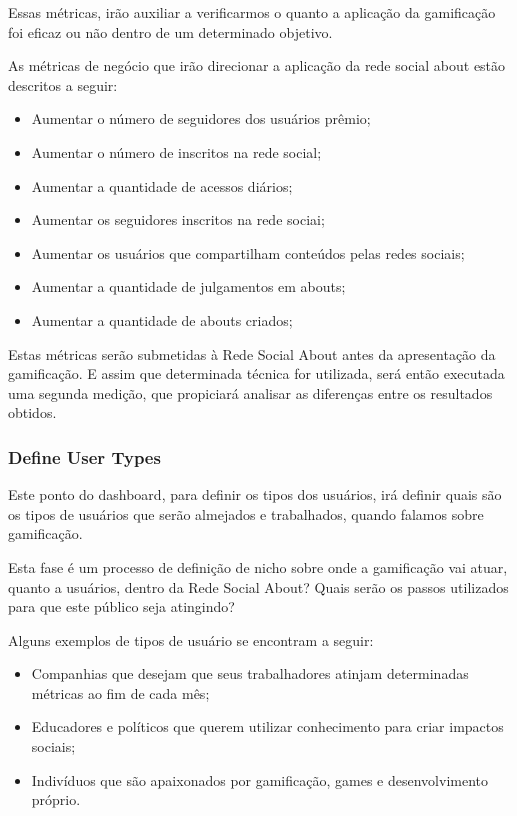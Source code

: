 Essas métricas, irão auxiliar a verificarmos o quanto a aplicação da gamificação foi 
eficaz ou não dentro de um determinado objetivo.

As métricas de negócio que irão direcionar a aplicação da rede social about estão
descritos a seguir:

\begin{itemize}
    \item Aumentar o número de seguidores dos usuários prêmio;
    \item Aumentar o número de inscritos na rede social;
    \item Aumentar a quantidade de acessos diários;
    \item Aumentar os seguidores inscritos na rede sociai;
    \item Aumentar os usuários que compartilham conteúdos pelas redes sociais;
    \item Aumentar a quantidade de julgamentos em abouts;
    \item Aumentar a quantidade de abouts criados;
\end{itemize}

Estas métricas serão submetidas à Rede Social About antes da apresentação da
gamificação. E assim que determinada técnica for utilizada, será então executada uma
segunda medição, que propiciará analisar as diferenças entre os resultados obtidos.

\subsubsection{Define User Types}
\label{sub:define_user_types}
Este ponto do dashboard, para definir os tipos dos usuários, irá
definir quais são os tipos de usuários que serão almejados e trabalhados, quando
falamos sobre gamificação.

Esta fase é um processo de definição de nicho sobre onde a gamificação vai atuar, quanto a
usuários, dentro da Rede Social About? Quais serão os passos utilizados para que este público
seja atingindo?

Alguns exemplos de tipos de usuário se encontram a seguir:

\begin{itemize}
    \item Companhias que desejam que seus trabalhadores atinjam determinadas métricas
        ao fim de cada mês;
    \item Educadores e políticos que querem utilizar conhecimento para criar impactos
        sociais;
    \item Indivíduos que são apaixonados por gamificação, games e desenvolvimento próprio.
\end{itemize}

